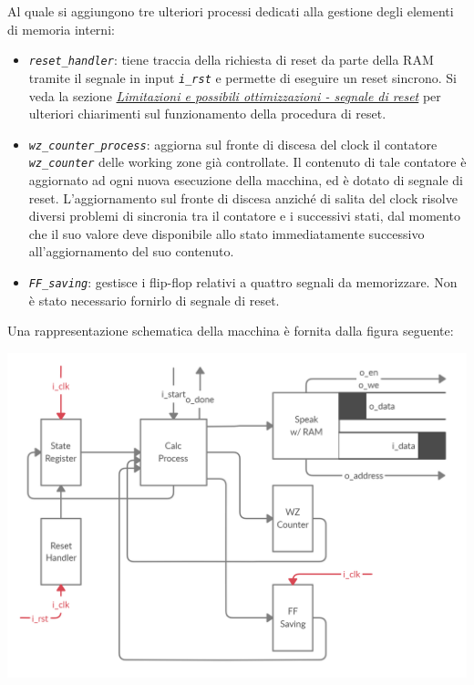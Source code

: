 \documentclass[12pt,a4paper,titlepage]{article}
\begin{document}
		Al quale si aggiungono tre ulteriori processi dedicati alla gestione degli elementi di memoria interni:
		\begin{itemize}
			\item \textit{\texttt{reset\_handler}}: tiene traccia della richiesta di reset da parte della RAM tramite il segnale in input \textit{\texttt{i\_rst}} e permette di eseguire un reset sincrono. Si veda la sezione \hyperref[sec:reset]{\textit{Limitazioni e possibili ottimizzazioni - segnale di reset}} per ulteriori chiarimenti sul funzionamento della procedura di reset.	%
			
			\item \textit{\texttt{wz\_counter\_process}}: aggiorna sul fronte di discesa del clock il contatore \textit{\texttt{wz\_counter}} delle working zone già controllate. Il contenuto di tale contatore è aggiornato ad ogni nuova esecuzione della macchina, ed è dotato di segnale di reset. L'aggiornamento sul fronte di discesa anziché di salita del clock risolve diversi problemi di sincronia tra il contatore e i successivi stati, dal momento che il suo valore deve disponibile allo stato immediatamente successivo all'aggiornamento del suo contenuto.
			
			\item \textit{\texttt{FF\_saving}}: gestisce i flip-flop relativi a quattro segnali da memorizzare. Non è stato necessario fornirlo di segnale di reset.
			
		\end{itemize}
		
		Una rappresentazione schematica della macchina è fornita dalla figura seguente:
		\begin{center}
			\includegraphics[scale=0.325]{arch_v1_1.png}
		\end{center}
		
\end{document}
